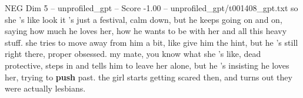 \begin{textsample}{NEG Dim 5 – unprofiled\_gpt – Score -1.00 – unprofiled\_gpt/t001408\_gpt.txt}  \label{ex:f5_neg_007}
so she ’s like look it ’s just a festival, calm down, but he keeps going on and on, saying how much he loves her, how he wants to be with her and all this heavy stuff. she tries to move away from him a bit, like give him the hint, but he ’s still right there, proper obsessed. my mate, you know what she ’s like, dead protective, steps in and tells him to leave her alone, but he ’s insisting he loves her, trying to \textbf{push} past. the girl starts getting scared then, and turns out they were actually lesbians.

\end{textsample}
